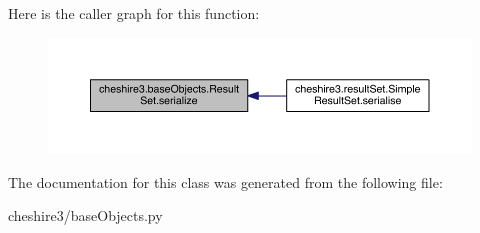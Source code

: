 Here is the caller graph for this function\-:
\nopagebreak
\begin{figure}[H]
\begin{center}
\leavevmode
\includegraphics[width=350pt]{classcheshire3_1_1base_objects_1_1_result_set_a6469fbd23b7f794342e1991dfcb10bc2_icgraph}
\end{center}
\end{figure}




The documentation for this class was generated from the following file\-:\begin{DoxyCompactItemize}
\item 
cheshire3/base\-Objects.\-py\end{DoxyCompactItemize}
